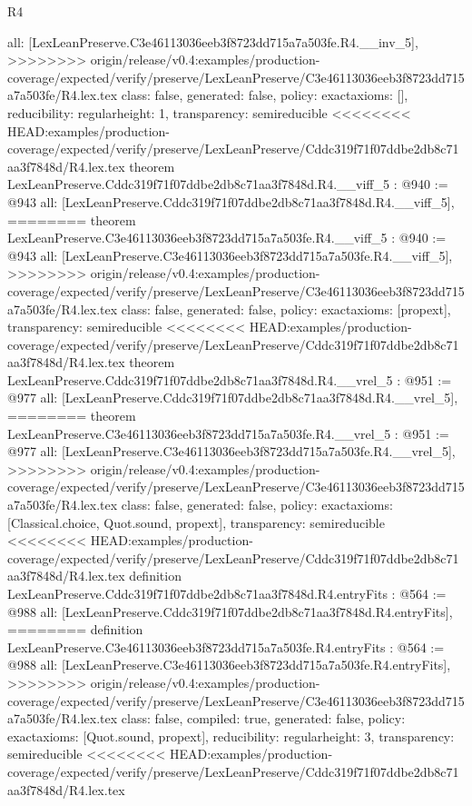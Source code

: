 \begin{lexlean}{R4}
\begin{coremodule}
{{{{{{{{{{{{  all: [LexLeanPreserve.C3e46113036eeb3f8723dd715a7a503fe.R4.__inv_5],
>>>>>>>> origin/release/v0.4:examples/production-coverage/expected/verify/preserve/LexLeanPreserve/C3e46113036eeb3f8723dd715a7a503fe/R4.lex.tex
  class: false,
  generated: false,
  policy: exact{axioms: []},
  reducibility: regular{height: 1},
  transparency: semireducible
}
<<<<<<<< HEAD:examples/production-coverage/expected/verify/preserve/LexLeanPreserve/Cddc319f71f07ddbe2db8c71aa3f7848d/R4.lex.tex
theorem LexLeanPreserve.Cddc319f71f07ddbe2db8c71aa3f7848d.R4.__viff_5 : @940 := @943 {
  all: [LexLeanPreserve.Cddc319f71f07ddbe2db8c71aa3f7848d.R4.__viff_5],
========
theorem LexLeanPreserve.C3e46113036eeb3f8723dd715a7a503fe.R4.__viff_5 : @940 := @943 {
  all: [LexLeanPreserve.C3e46113036eeb3f8723dd715a7a503fe.R4.__viff_5],
>>>>>>>> origin/release/v0.4:examples/production-coverage/expected/verify/preserve/LexLeanPreserve/C3e46113036eeb3f8723dd715a7a503fe/R4.lex.tex
  class: false,
  generated: false,
  policy: exact{axioms: [propext]},
  transparency: semireducible
}
<<<<<<<< HEAD:examples/production-coverage/expected/verify/preserve/LexLeanPreserve/Cddc319f71f07ddbe2db8c71aa3f7848d/R4.lex.tex
theorem LexLeanPreserve.Cddc319f71f07ddbe2db8c71aa3f7848d.R4.__vrel_5 : @951 := @977 {
  all: [LexLeanPreserve.Cddc319f71f07ddbe2db8c71aa3f7848d.R4.__vrel_5],
========
theorem LexLeanPreserve.C3e46113036eeb3f8723dd715a7a503fe.R4.__vrel_5 : @951 := @977 {
  all: [LexLeanPreserve.C3e46113036eeb3f8723dd715a7a503fe.R4.__vrel_5],
>>>>>>>> origin/release/v0.4:examples/production-coverage/expected/verify/preserve/LexLeanPreserve/C3e46113036eeb3f8723dd715a7a503fe/R4.lex.tex
  class: false,
  generated: false,
  policy: exact{axioms: [Classical.choice, Quot.sound, propext]},
  transparency: semireducible
}
<<<<<<<< HEAD:examples/production-coverage/expected/verify/preserve/LexLeanPreserve/Cddc319f71f07ddbe2db8c71aa3f7848d/R4.lex.tex
definition LexLeanPreserve.Cddc319f71f07ddbe2db8c71aa3f7848d.R4.entryFits : @564 := @988 {
  all: [LexLeanPreserve.Cddc319f71f07ddbe2db8c71aa3f7848d.R4.entryFits],
========
definition LexLeanPreserve.C3e46113036eeb3f8723dd715a7a503fe.R4.entryFits : @564 := @988 {
  all: [LexLeanPreserve.C3e46113036eeb3f8723dd715a7a503fe.R4.entryFits],
>>>>>>>> origin/release/v0.4:examples/production-coverage/expected/verify/preserve/LexLeanPreserve/C3e46113036eeb3f8723dd715a7a503fe/R4.lex.tex
  class: false,
  compiled: true,
  generated: false,
  policy: exact{axioms: [Quot.sound, propext]},
  reducibility: regular{height: 3},
  transparency: semireducible
}
<<<<<<<< HEAD:examples/production-coverage/expected/verify/preserve/LexLeanPreserve/Cddc319f71f07ddbe2db8c71aa3f7848d/R4.lex.tex
}}}}}}}}}}}}}}
\end{coremodule}
\end{lexlean}
